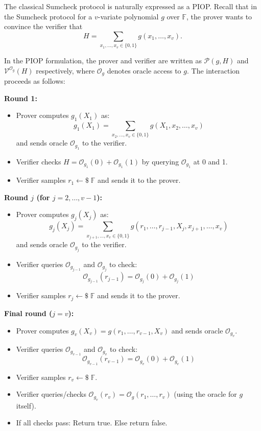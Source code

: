 \documentclass[11pt]{article}
\theoremstyle{plain}
\theoremstyle{definition}
\newcommand{\F}{\mathbb{F}}
\begin{document}
The classical Sumcheck protocol is naturally expressed as a PIOP. Recall that
in the Sumcheck protocol for a $v$-variate polynomial $g$ over $\F$, the prover
wants to convince the verifier that
\[
  H = \sum_{x_1,\ldots,x_v \in \{0,1\}} g(x_1, \ldots, x_v).
\]

In the PIOP formulation, the prover and verifier are written as
$\mathcal{P}(g, H)$ and $\mathcal{V}^{\mathcal{O}_g}(H)$ respectively, where
$\mathcal{O}_g$ denotes oracle access to $g$. The interaction proceeds as
follows:

\bigskip
\noindent\textbf{Round 1:}
\begin{itemize}
  \item Prover computes $g_1(X_1)$ as:
    \[
      g_1(X_1) = \sum_{x_2, \ldots, x_v \in \{0,1\}} g(X_1, x_2, \ldots, x_v)
    \]
    and sends oracle $\mathcal{O}_{g_1}$ to the verifier.
  \item Verifier checks $H = \mathcal{O}_{g_1}(0) + \mathcal{O}_{g_1}(1)$ by
    querying $\mathcal{O}_{g_1}$ at 0 and 1.
  \item Verifier samples $r_1 \leftarrow \$ \; \F$ and sends it to the prover.
\end{itemize}

\bigskip
\noindent\textbf{Round $j$ (for $j = 2, \ldots, v-1$):}
\begin{itemize}
  \item Prover computes $g_j(X_j)$ as:
    \[
      g_j(X_j) = \sum_{x_{j+1}, \ldots, x_v \in \{0,1\}}
        g(r_1, \ldots, r_{j-1}, X_j, x_{j+1}, \ldots, x_v)
    \]
    and sends oracle $\mathcal{O}_{g_j}$ to the verifier.
  \item Verifier queries $\mathcal{O}_{g_{j-1}}$ and $\mathcal{O}_{g_j}$ to
    check:
    \[
      \mathcal{O}_{g_{j-1}}(r_{j-1}) = \mathcal{O}_{g_j}(0) + \mathcal{O}_{g_j}(1)
    \]
  \item Verifier samples $r_j \leftarrow \$ \; \F$ and sends it to the prover.
\end{itemize}

\bigskip
\noindent\textbf{Final round ($j = v$):}
\begin{itemize}
  \item Prover computes $g_v(X_v) = g(r_1, \ldots, r_{v-1}, X_v)$ and sends
    oracle $\mathcal{O}_{g_v}$.
  \item Verifier queries $\mathcal{O}_{g_{v-1}}$ and $\mathcal{O}_{g_v}$ to
    check:
    \[
      \mathcal{O}_{g_{v-1}}(r_{v-1}) = \mathcal{O}_{g_v}(0) + \mathcal{O}_{g_v}(1)
    \]
  \item Verifier samples $r_v \leftarrow \$ \; \F$.
  \item Verifier queries/checks $\mathcal{O}_{g_v}(r_v) = \mathcal{O}_g(r_1,
    \ldots, r_v)$ (using the oracle for $g$ itself).
  \item If all checks pass: Return true. Else return false.
\end{itemize}
\end{document}
